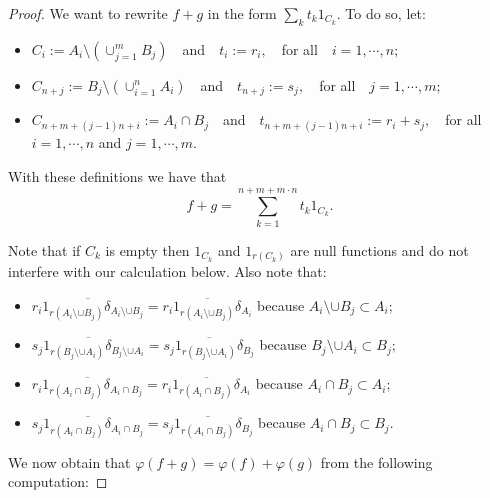 \documentclass[11pt, a4paper]{amsart}
\theoremstyle{plain}
\begin{document}
\begin{proof}
We want to rewrite $f+g$ in the form $\sum_k t_k1_{C_k}.$ To do so, let:

\begin{itemize}
\item $C_i := A_i \setminus (\cup_{j=1}^{m}B_j)$ \,\, and \,\, $t_i:=r_i,$ \,\, for all \,\, $i=1, \cdots, n;$ \vspace{0.1cm}
\item $C_{n+j}:= B_j \setminus (\cup_{i=1}^{n}A_i) $ \,\, and \,\, $t_{n+j}:=s_j,$ \,\, for all \,\, $j=1, \cdots ,m;$ \vspace{0.1cm}
\item $C_{n+m+(j-1)n+i} := A_i \cap B_j$ \,\, and \,\, $t_{n+m+(j-1)n+i}:=r_i+s_j,$ \,\, for all \,\, $i=1, \cdots, n$ and $j=1, \cdots, m.$
\end{itemize}

With these definitions we have that
$$ f+g=\sum_{k=1}^{n+m+m\cdot n} t_k 1_{C_k}. $$

Note that if $C_k$ is empty then $1_{C_k} $ and $1_{r(C_k)}$ are null functions and do not interfere with our calculation below. Also note that:

\begin{itemize}
\item $\overline{r_i 1_{r(A_i\setminus \cup B_j)} \delta_{A_i \setminus \cup B_j}} = \overline{r_i 1_{r(A_i\setminus \cup B_j)} \delta_{A_i }}$ because $A_i \setminus \cup B_j  \subset A_i;$ \vspace{0.15cm}

\item $\overline{s_j 1_{r(B_j\setminus \cup A_i)} \delta_{B_j \setminus \cup A_i}} = \overline{s_j 1_{r(B_j \setminus \cup A_i)} \delta_{B_j}}$ because $B_j \setminus \cup A_i  \subset B_j;$ \vspace{0.15cm}

\item $\overline{r_i 1_{r(A_i \cap B_j)} \delta_{A_i \cap B_j}} = \overline{r_i 1_{r(A_i \cap B_j)} \delta_{A_i }}$ because $A_i \cap B_j \subset A_i;$ \vspace{0.15cm}

\item $\overline{s_j 1_{r(A_i \cap B_j)} \delta_{A_i \cap B_j}} = \overline{s_j 1_{r(A_i \cap B_j)} \delta_{B_j }}$ because $A_i \cap B_j \subset B_j.$
\end{itemize}
  
We now obtain that $\varphi(f+g)=\varphi(f)+\varphi(g)$ from the following computation:


\end{proof}
\end{document}
